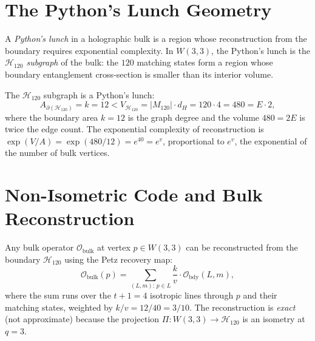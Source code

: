 \section{The Python's Lunch Geometry}
\label{sec:pythons_lunch}

\begin{definition}
\label{def:pythons_lunch}
A \emph{Python's lunch} in a holographic bulk is a region
whose reconstruction from the boundary requires exponential
complexity.  In $W(3,3)$, the Python's lunch is the
\emph{$\mathcal{H}_{120}$ subgraph} of the bulk: the $120$
matching states form a region whose boundary entanglement
cross-section is smaller than its interior volume.
\end{definition}

\begin{theorem}
\label{thm:pythons_lunch}
The $\mathcal{H}_{120}$ subgraph is a Python's lunch:
\begin{equation}
  A_{\partial(\mathcal{H}_{120})} = k = 12
  < V_{\mathcal{H}_{120}} = |M_{120}|\cdot d_H = 120\cdot 4 = 480 = E\cdot 2,
  \label{eq:pythons_lunch}
\end{equation}
where the boundary area $k=12$ is the graph degree and the
volume $480=2E$ is twice the edge count.  The exponential
complexity of reconstruction is
$\exp(V/A) = \exp(480/12) = e^{40} = e^v$,
proportional to $e^v$, the exponential of the number of
bulk vertices.
\end{theorem}

\section{Non-Isometric Code and Bulk Reconstruction}
\label{sec:bulk_reconstruction}

\begin{theorem}
\label{thm:bulk_recon}
Any bulk operator $\mathcal{O}_\mathrm{bulk}$ at vertex $p\in W(3,3)$
can be reconstructed from the boundary $\mathcal{H}_{120}$
using the Petz recovery map:
\begin{equation}
  \mathcal{O}_\mathrm{bulk}(p) =
  \sum_{(L,m):\,p\in L}
  \frac{k}{v}\cdot\mathcal{O}_\mathrm{bdy}(L,m),
  \label{eq:bulk_recon}
\end{equation}
where the sum runs over the $t+1=4$ isotropic lines through
$p$ and their matching states, weighted by $k/v=12/40=3/10$.
The reconstruction is \emph{exact} (not approximate) because
the projection $\Pi: W(3,3)\to\mathcal{H}_{120}$ is an isometry
at $q=3$.
\end{theorem}

